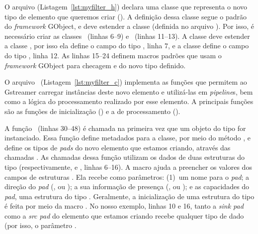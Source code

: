 O arquivo  (Listagem~\ref{lst:myfilter_h}) declara uma classe que
representa o novo tipo de elemento que queremos criar ().  A
definição dessa classe segue o padrão do \emph{framework} GObject, e deve
estender a classe  (definida no arquivo ).  Por
isso, é necessário criar as classes ~(linhas 6--9) e
~(linhas 11--13).  A classe  deve estender a
classe , por isso ela define o campo  do tipo
, linha 7, e a classe  define o campo
 do tipo , linha 12.  As linhas 15--24
definem macros padrões que usam o \emph{framework} GObject para checagem e
 do novo tipo definido.



O arquivo ~(Listagem~\ref{lst:myfilter_c}) implementa as funções
que permitem ao Gstreamer carregar instâncias deste novo elemento e utilizá-las
em \emph{pipeline}s, bem como a lógica do processamento realizado por esse
elemento.  A principais funções são as funções de inicialização () e
a de processamento ().

A função ~(linhas 30--48) é chamada na primeira vez
que um objeto do tipo  for instanciado.  Essa função define
metadados para a classe, por meio do método ,
e define os tipos de \emph{pads} do novo elemento que estamos criando, através
das chamadas .  As chamadas dessa função
utilizam os dados de duas estruturas do tipo 
(respectivamente,  e , linhas 6--16).  A macro
 ajuda a preencher os valores dos campos de
estruturas .  Ela recebe como parâmetros: (1)~um nome
para o \emph{pad}; a direção do \emph{pad} (,
 ou ); a sua informação de presença
(,  ou ); e as
capacidades do \emph{pad}, uma estrutura do tipo .  Geralmente, a
inicialização de uma estrutura do tipo  é feita por meio da macro
. No nosso exemplo, linhas 10 e 16, tanto a \emph{sink pad}
como a \emph{src pad} do elemento que estamos criando recebe qualquer tipo de
dado (por isso, o parâmetro .

